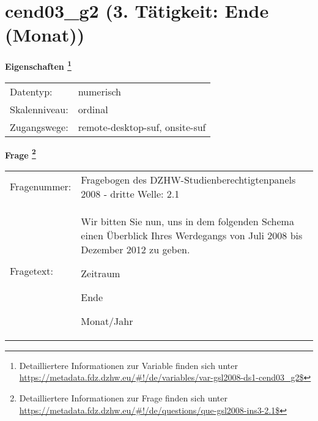 
    \setcounter{footnote}{0}

    \vspace*{-1.8cm}
	\section{cend03\_g2 (3. Tätigkeit: Ende (Monat))}
	\label{section:cend03_g2}



    \vspace*{0.5cm}
    \noindent\textbf{Eigenschaften
	\footnote{Detailliertere Informationen zur Variable finden sich unter
		\url{https://metadata.fdz.dzhw.eu/\#!/de/variables/var-gsl2008-ds1-cend03_g2$}}}\\
	\begin{tabularx}{\hsize}{@{}lX}
	Datentyp: & numerisch \\
	Skalenniveau: & ordinal \\
	Zugangswege: &
	  remote-desktop-suf, 
	  onsite-suf
 \\
    \end{tabularx}



				\vspace*{0.5cm}
                \noindent\textbf{Frage
	                \footnote{Detailliertere Informationen zur Frage finden sich unter
		              \url{https://metadata.fdz.dzhw.eu/\#!/de/questions/que-gsl2008-ins3-2.1$}}}\\
				\begin{tabularx}{\hsize}{@{}lX}
					Fragenummer: &
					  Fragebogen des DZHW-Studienberechtigtenpanels 2008 - dritte Welle:
					  2.1
 \\
					Fragetext: & Wir bitten Sie nun, uns in dem folgenden Schema einen Überblick Ihres Werdegangs von Juli 2008 bis Dezember 2012 zu geben.\par  Zeitraum\par  Ende\par  Monat/Jahr \\
				\end{tabularx}






